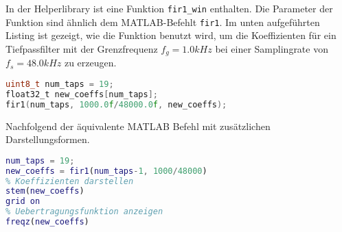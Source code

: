 In der Helperlibrary ist eine Funktion \texttt{fir1\_win} enthalten.
Die Parameter der Funktion sind ähnlich dem MATLAB-Befehlt \texttt{fir1}.
Im unten aufgeführten Listing ist gezeigt, wie die Funktion benutzt wird, um die Koeffizienten für ein Tiefpassfilter mit der Grenzfrequenz $f_g=1.0\si{kHz}$ bei einer Samplingrate von $f_s=48.0\si{kHz}$ zu erzeugen.



\begin{lstlisting}[language=c]
uint8_t num_taps = 19;
float32_t new_coeffs[num_taps];
fir1(num_taps, 1000.0f/48000.0f, new_coeffs);
\end{lstlisting}


Nachfolgend der äquivalente MATLAB Befehl mit zusätzlichen Darstellungsformen.



\begin{lstlisting}[language=matlab]
num_taps = 19;
new_coeffs = fir1(num_taps-1, 1000/48000)
% Koeffizienten darstellen
stem(new_coeffs)
grid on
% Uebertragungsfunktion anzeigen
freqz(new_coeffs)
\end{lstlisting}



